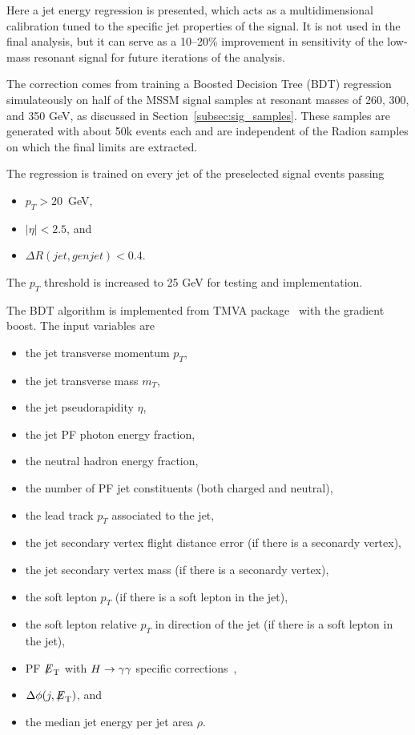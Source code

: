 Here a jet energy regression is presented, which acts as a multidimensional calibration tuned to the
specific jet properties of the signal. It is not used in the final analysis, but it can serve
as a 10--20\% improvement in sensitivity of the low-mass resonant signal
for future iterations of the analysis.

The correction comes from training a Boosted Decision Tree (BDT) regression simulateously
on half of the MSSM signal
samples at resonant masses of 260, 300, and 350 GeV, as discussed in Section~\ref{subsec:sig_samples}.
These samples are generated with about 50k events each and are independent of the Radion
samples on which the final limits are extracted.

The regression is trained on every jet of the preselected signal events passing 
\begin{itemize}
\item $p_T > 20$~GeV,
\item $|\eta|<2.5$, and
\item $\Delta R (jet, genjet) < 0.4$.
\end{itemize}                                                                                           
The $p_T$ threshold is increased to 25 GeV for testing and implementation.

The BDT algorithm is implemented from TMVA package~\cite{TMVA2007} with the gradient boost.
The input variables are
\begin{itemize}
\item the jet transverse momentum $p_T$,
\item the jet transverse mass $m_T$,
\item the jet pseudorapidity $\eta$,
\item the jet PF photon energy fraction,
\item the neutral hadron energy fraction,
\item the number of PF jet constituents (both charged and neutral),
\item the lead track $p_T$ associated to the jet,
\item the jet secondary vertex flight distance error (if there is a seconardy vertex),
\item the jet secondary vertex mass (if there is a seconardy vertex),
\item the soft lepton $p_T$ (if there is a soft lepton in the jet),
\item the soft lepton relative $p_T$ in direction of the jet (if there is a soft lepton in the jet),
\item PF ${\not\mathrel{E}}_{\text{T}}$ with $H\to\gamma\gamma$ specific corrections~\cite{HggCMS},
\item $\Delta \phi (j, {\not\mathrel{E}}_{\text{T}})$, and
\item the median jet energy per jet area $\rho$. 
\end{itemize}

